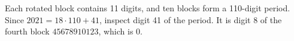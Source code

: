 Each rotated block contains 11 digits, and ten blocks form a 110-digit period. Since $2021=18\cdot110+41$, inspect digit 41 of the period. It is digit 8 of the fourth block $45678910123$, which is $\boxed0$.
